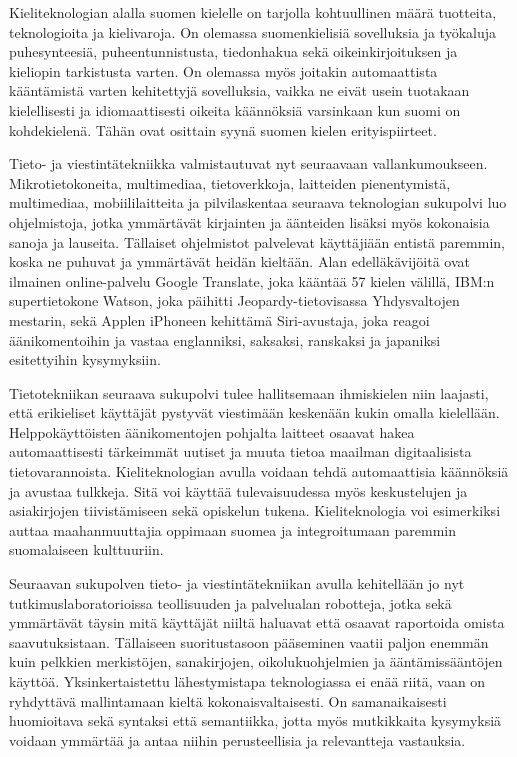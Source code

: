 \begin{multicols}{2}
Kieliteknologian alalla suomen kielelle on tarjolla kohtuullinen määrä tuotteita, teknologioita ja kielivaroja. On olemassa suomenkielisiä sovelluksia ja työkaluja puhesynteesiä, puheentunnistusta, tiedonhakua sekä oikeinkirjoituksen ja kieliopin tarkistusta varten. On olemassa myös joitakin automaattista kääntämistä varten kehitettyjä sovelluksia, vaikka ne eivät usein tuotakaan kielellisesti ja idiomaattisesti oikeita käännöksiä varsinkaan kun suomi on kohdekielenä. Tähän ovat osittain syynä suomen kielen erityispiirteet.
\columnbreak

Tieto- ja viestintätekniikka valmistautuvat nyt seuraavaan vallankumoukseen.  Mikrotietokoneita, multimediaa, tietoverkkoja, laitteiden pienentymistä, multimediaa, mobiililaitteita ja pilvilaskentaa seuraava teknologian sukupolvi luo ohjelmistoja, jotka ymmärtävät kirjainten ja äänteiden lisäksi myös kokonaisia sanoja ja lauseita. Tällaiset ohjelmistot palvelevat käyttäjiään entistä paremmin, koska ne puhuvat ja ymmärtävät heidän kieltään. Alan edelläkävijöitä ovat ilmainen online-palvelu Google Translate, joka kääntää 57 kielen välillä, IBM:n supertietokone Watson, joka päihitti Jeopardy-tietovisassa Yhdysvaltojen mestarin, sekä Applen iPhoneen kehittämä Siri-avustaja, joka reagoi äänikomentoihin ja vastaa englanniksi, saksaksi, ranskaksi ja japaniksi esitettyihin kysymyksiin.

Tietotekniikan seuraava sukupolvi tulee hallitsemaan ihmiskielen niin laajasti, että erikieliset käyttäjät pystyvät viestimään keskenään kukin omalla kielellään. Helppokäyttöisten äänikomentojen pohjalta laitteet osaavat hakea automaattisesti tärkeimmät uutiset ja muuta tietoa maailman digitaalisista tietovarannoista. Kieliteknologian avulla voidaan tehdä automaattisia käännöksiä ja avustaa tulkkeja. Sitä voi käyttää tulevaisuudessa myös keskustelujen ja asiakirjojen tiivistämiseen sekä opiskelun tukena. Kieliteknologia voi esimerkiksi auttaa maahanmuuttajia oppimaan suomea ja integroitumaan paremmin suomalaiseen kulttuuriin.

Seuraavan sukupolven tieto- ja viestintätekniikan avulla kehitellään jo nyt tutkimuslaboratorioissa teollisuuden ja palvelualan robotteja, jotka sekä ymmärtävät täysin mitä käyttäjät niiltä haluavat että osaavat raportoida omista saavutuksistaan.
Tällaiseen suoritustasoon pääseminen vaatii paljon enemmän kuin pelkkien merkistöjen, sanakirjojen, oikolukuohjelmien ja ääntämissääntöjen käyttöä. Yksinkertaistettu lähestymistapa teknologiassa ei enää riitä, vaan on ryhdyttävä mallintamaan kieltä kokonaisvaltaisesti. On samanaikaisesti huomioitava sekä syntaksi että semantiikka, jotta myös mutkikkaita kysymyksiä voidaan ymmärtää ja antaa niihin perusteellisia ja relevantteja vastauksia.


\end{multicols}
